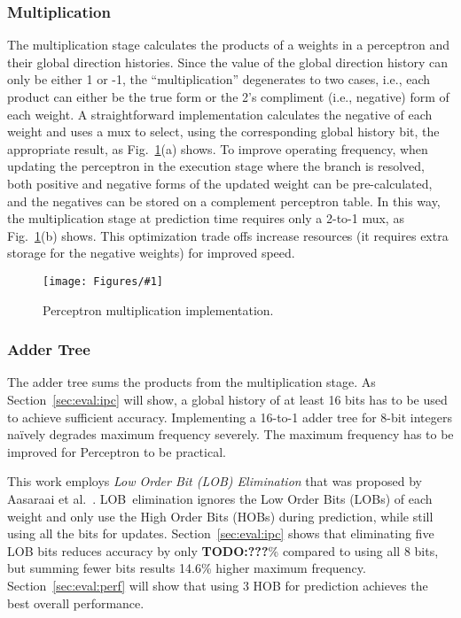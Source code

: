 \documentclass[conference]{IEEEtran}
\newcommand{\kfig}[4]{ %
        \begin{figure}[!t]
        \centering
        \texttt{[image: Figures/\#1]}
        \vspace{-1mm}
        \caption{#3}
        \label{#2}
        \end{figure}
}
\begin{document}
\subsubsection{Multiplication}
\label{sec:fpga:perceptron:mult}
The multiplication stage calculates the products of a weights in a perceptron and their global direction histories. Since the value of the global direction history can only be either 1 or -1, the ``multiplication'' degenerates to two cases, i.e., each product can either be the true form or the 2's compliment (i.e., negative) form of each weight. A straightforward implementation calculates the negative of each weight and uses a mux to select, using the corresponding global history bit, the appropriate result, as Fig.~\ref{fig:perceptronMult}(a) shows. To improve operating frequency, when updating the perceptron in the execution stage where the branch is resolved, both positive and negative forms of the updated weight can be pre-calculated, and the negatives can be stored on a complement perceptron table. In this way, the multiplication stage at prediction time requires only a 2-to-1 mux, as Fig.~\ref{fig:perceptronMult}(b) shows. This optimization trade offs increase resources (it requires extra storage for the negative weights) for improved speed.
\kfig{perceptronMult.pdf}{fig:perceptronMult}{Perceptron multiplication implementation.}{angle = 0, trim = 0.3in 2.2in 3in 0.6in, clip, width=0.3\textwidth}

\subsubsection{Adder Tree}
\label{sec:fpga:perceptron:adder}
The adder tree sums the products from the multiplication stage. As Section~\ref{sec:eval:ipc} will show, a global history of at least 16 bits has to be used to achieve sufficient accuracy. Implementing a 16-to-1 adder tree for 8-bit integers na\"ively degrades maximum frequency severely. The maximum frequency has to be improved for Perceptron to be practical.

This work employs \textit{Low Order Bit (LOB) Elimination} that was proposed by Aasaraai et al.~\cite{lob}. LOB\ elimination ignores the Low Order Bits (LOBs) of each weight and only use the High Order Bits (HOBs) during prediction, while still using all the bits for updates. Section~\ref{sec:eval:ipc} shows that eliminating five LOB bits reduces accuracy by only \textbf{TODO:???}\% compared to using all 8 bits, but summing fewer bits results 14.6\% higher maximum frequency. Section~\ref{sec:eval:perf} will show that using 3 HOB for prediction achieves the best overall performance.
\end{document}
